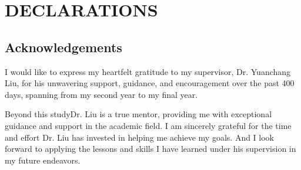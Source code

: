 \section{DECLARATIONS}
\label{sec:declarations}
\subsection{Acknowledgements}
I would like to express my heartfelt gratitude to my supervisor, Dr. Yuanchang Liu, 
for his unwavering support, guidance, and encouragement over the past 400 days, 
spanning from my second year to my final year. 

Beyond this studyDr. Liu is a true mentor, 
providing me with exceptional guidance and support in the academic field. 
I am sincerely grateful for the time and effort Dr. Liu has invested in helping me achieve my goals. 
And I look forward to applying the lessons and skills I have learned under his supervision in my future endeavors.

